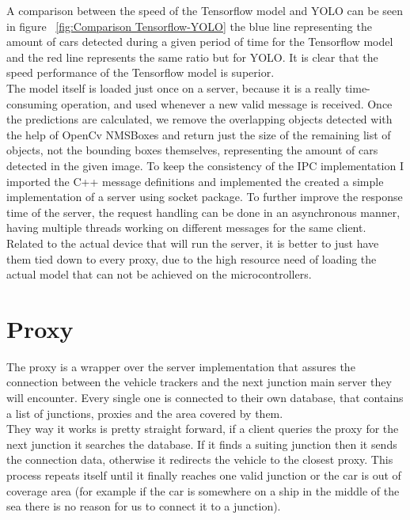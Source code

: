 \documentclass[17pt]{report}
\begin{document}
A comparison between the speed of the Tensorflow model and YOLO can 
be seen in figure ~\ref{fig:Comparison Tensorflow-YOLO} the blue line
representing the amount of cars detected during a given period of time
for the Tensorflow model and the red line represents the same ratio
but for YOLO. It is clear that the speed performance of the
Tensorflow model is superior.\\
\indent
The model itself is loaded just once on a server, because it is a really
time-consuming operation, and used whenever a new valid message is received.
Once the predictions are calculated, we remove the overlapping objects
detected with the help of OpenCv NMSBoxes and return just the size 
of the remaining list of objects, not the bounding boxes themselves, representing 
the amount of cars detected in the given image. To keep the consistency of the IPC
implementation I imported the C++ message definitions and implemented the created
a simple implementation of a server using socket package. To further improve
the response time of the server, the request handling can be done in an asynchronous
manner, having multiple threads working on different messages for the same client. \\
\indent
Related to the actual device that will run the server, it is better to just have 
them tied down to every proxy, due to the high resource need of loading the actual 
model that can not be achieved on the microcontrollers.


\pagebreak

\section{Proxy}
\indent \indent
The proxy is a wrapper over the server implementation that assures the connection
between the vehicle trackers and the next junction main server they will encounter.
Every single one is connected to their own database, that contains a list of junctions,
proxies and the area covered by them. \\
\indent \indent
They way it works is pretty straight forward, if a client 
queries the proxy for the next junction it searches the database. If it finds 
a suiting junction then it sends the connection data, otherwise it redirects 
the vehicle to the closest proxy. This process repeats itself until it 
finally reaches one valid junction or the car is out of coverage area (for 
example if the car is somewhere on a ship in the middle of the sea there is 
no reason for us to connect it to a junction).
\end{document}

